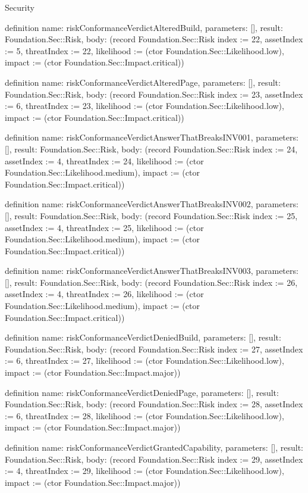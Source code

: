 \begin{lexlean}{Security}
\begin{semanticmodule}
definition{
  name: riskConformanceVerdictAlteredBuild,
  parameters: [],
  result: Foundation.Sec::Risk,
  body: (record Foundation.Sec::Risk {index := 22, assetIndex := 5, threatIndex := 22, likelihood := (ctor Foundation.Sec::Likelihood.low), impact := (ctor Foundation.Sec::Impact.critical)})
}

definition{
  name: riskConformanceVerdictAlteredPage,
  parameters: [],
  result: Foundation.Sec::Risk,
  body: (record Foundation.Sec::Risk {index := 23, assetIndex := 6, threatIndex := 23, likelihood := (ctor Foundation.Sec::Likelihood.low), impact := (ctor Foundation.Sec::Impact.critical)})
}

definition{
  name: riskConformanceVerdictAnswerThatBreaksINV001,
  parameters: [],
  result: Foundation.Sec::Risk,
  body: (record Foundation.Sec::Risk {index := 24, assetIndex := 4, threatIndex := 24, likelihood := (ctor Foundation.Sec::Likelihood.medium), impact := (ctor Foundation.Sec::Impact.critical)})
}

definition{
  name: riskConformanceVerdictAnswerThatBreaksINV002,
  parameters: [],
  result: Foundation.Sec::Risk,
  body: (record Foundation.Sec::Risk {index := 25, assetIndex := 4, threatIndex := 25, likelihood := (ctor Foundation.Sec::Likelihood.medium), impact := (ctor Foundation.Sec::Impact.critical)})
}

definition{
  name: riskConformanceVerdictAnswerThatBreaksINV003,
  parameters: [],
  result: Foundation.Sec::Risk,
  body: (record Foundation.Sec::Risk {index := 26, assetIndex := 4, threatIndex := 26, likelihood := (ctor Foundation.Sec::Likelihood.medium), impact := (ctor Foundation.Sec::Impact.critical)})
}

definition{
  name: riskConformanceVerdictDeniedBuild,
  parameters: [],
  result: Foundation.Sec::Risk,
  body: (record Foundation.Sec::Risk {index := 27, assetIndex := 6, threatIndex := 27, likelihood := (ctor Foundation.Sec::Likelihood.low), impact := (ctor Foundation.Sec::Impact.major)})
}

definition{
  name: riskConformanceVerdictDeniedPage,
  parameters: [],
  result: Foundation.Sec::Risk,
  body: (record Foundation.Sec::Risk {index := 28, assetIndex := 6, threatIndex := 28, likelihood := (ctor Foundation.Sec::Likelihood.low), impact := (ctor Foundation.Sec::Impact.major)})
}

definition{
  name: riskConformanceVerdictGrantedCapability,
  parameters: [],
  result: Foundation.Sec::Risk,
  body: (record Foundation.Sec::Risk {index := 29, assetIndex := 4, threatIndex := 29, likelihood := (ctor Foundation.Sec::Likelihood.low), impact := (ctor Foundation.Sec::Impact.major)})
}


\end{semanticmodule}
\end{lexlean}
